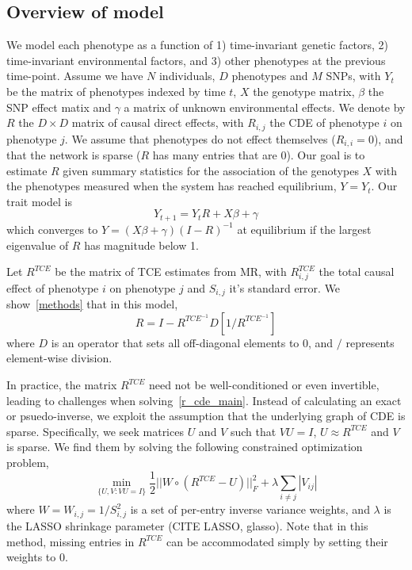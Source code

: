 \documentclass{article}
\begin{document}
\subsection{Overview of model}
We model each phenotype as a function of 1) time-invariant genetic factors, 2)
time-invariant environmental factors, and 3) other phenotypes at the previous
time-point.
Assume we have $N$ individuals, $D$ phenotypes and $M$ SNPs,
with $Y_t$ be the matrix of phenotypes indexed by time $t$, $X$ the genotype
matrix, $\beta$ the SNP effect matix and $\gamma$ a matrix of unknown
environmental effects. We denote by $R$ the $D \times D$ matrix of
causal direct effects, with $R_{i, j}$ the CDE of phenotype $i$ on
phenotype $j$. We assume that phenotypes do not effect themselves ($R_{i,i} = 0$),
and that the network is sparse ($R$ has many entries that are $0$).
Our goal is to estimate $R$ given summary statistics
 for the association of the genotypes $X$ with the phenotypes measured when
 the system has reached equilibrium, $Y = Y_{t}$.
 Our trait model is
\begin{equation}
Y_{t+1} = Y_{t} R + X\beta + \gamma
\end{equation}
which converges to $Y = (X\beta + \gamma)(I-R)^{-1}$ at equilibrium if the largest eigenvalue
of $R$ has magnitude below 1.

Let $R^{TCE}$ be the matrix of TCE estimates from MR, with $R^{TCE}_{i,j}$ the total
causal effect of phenotype $i$ on phenotype $j$ and $S_{i,j}$ it's standard error.
We show~\ref{methods} that
in this model,
\begin{equation}\label{r_cde_main}
R = I - R^{TCE^{-1}} D[1 / R^{TCE^{-1}}]
\end{equation}
where $D$ is an operator that sets all off-diagonal elements to 0, and $/$
represents element-wise division.

In practice, the matrix $R^{TCE}$ need not be well-conditioned or
 even invertible, leading
to challenges when solving~\ref{r_cde_main}. Instead of calculating an exact
or psuedo-inverse, we exploit the assumption that the underlying graph of
CDE is sparse. Specifically, we seek matrices $U$ and $V$ such that $VU=I$, $U \approx R^{TCE}$
and $V$ is sparse. We find them by solving the following constrained optimization problem,
\begin{equation} \label{opt_main}
\min_{\{U, V : VU = I\}} \frac{1}{2} ||W \circ (R^{TCE} - U)||_F^2 +
   \lambda \sum_{i\neq j}|V_{ij}|
\end{equation}
where $W = W_{i,j} = 1/S_{i,j}^2$ is a set of per-entry inverse variance weights,
and $\lambda$ is the LASSO shrinkage parameter (CITE LASSO, glasso). Note that in
this method, missing entries in $R^{TCE}$ can be accommodated simply
by setting their weights to 0.
\end{document}
